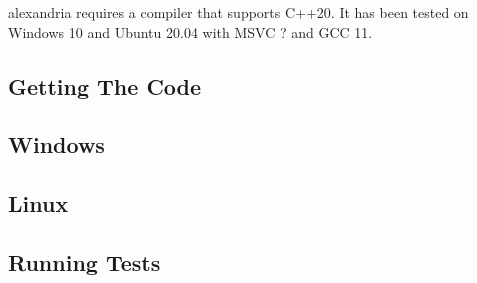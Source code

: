 \gls{alexandria} requires a compiler that supports C++20. It has been tested on Windows 10 and Ubuntu 20.04 with MSVC ? and GCC 11.

\subsection{Getting The Code}
\label{section:build:get}



\subsection{Windows}
\label{section:build:windows}


\subsection{Linux}
\label{section:build:linux}


\subsection{Running Tests}
\label{section:build:tests}
